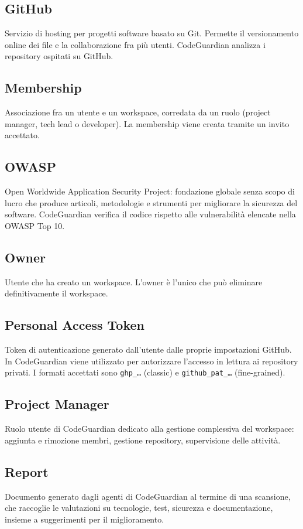 \documentclass[a4paper, 11pt]{article}
\begin{document}
\subsection{GitHub}
Servizio di hosting per progetti software basato su Git. Permette il versionamento online dei file e la collaborazione fra più utenti. CodeGuardian analizza i repository ospitati su GitHub.

\subsection{Membership}
Associazione fra un utente e un workspace, corredata da un ruolo (project manager, tech lead o developer). La membership viene creata tramite un invito accettato.

\subsection{OWASP}
Open Worldwide Application Security Project: fondazione globale senza scopo di lucro che produce articoli, metodologie e strumenti per migliorare la sicurezza del software. CodeGuardian verifica il codice rispetto alle vulnerabilità elencate nella OWASP Top 10.

\subsection{Owner}
Utente che ha creato un workspace. L'owner è l'unico che può eliminare definitivamente il workspace.

\subsection{Personal Access Token}
Token di autenticazione generato dall'utente dalle proprie impostazioni GitHub. In CodeGuardian viene utilizzato per autorizzare l'accesso in lettura ai repository privati. I formati accettati sono \texttt{ghp\_\ldots} (classic) e \texttt{github\_pat\_\ldots} (fine-grained).

\subsection{Project Manager}
Ruolo utente di CodeGuardian dedicato alla gestione complessiva del workspace: aggiunta e rimozione membri, gestione repository, supervisione delle attività.

\subsection{Report}
Documento generato dagli agenti di CodeGuardian al termine di una scansione, che raccoglie le valutazioni su tecnologie, test, sicurezza e documentazione, insieme a suggerimenti per il miglioramento.
\end{document}
